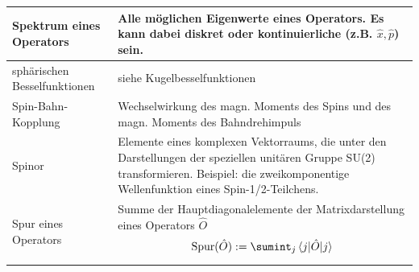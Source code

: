 \documentclass{article}
\begin{document}
\begin{xltabular}{\linewidth}{l|X}
	\hline
		Spektrum eines Operators & Alle möglichen Eigenwerte eines Operators. Es kann dabei diskret oder kontinuierliche (z.B. $\hat{x}, \hat{p}$) sein. \\
	\hline
		sphärischen Besselfunktionen & siehe Kugelbesselfunktionen \\
	\hline
		Spin-Bahn-Kopplung & Wechselwirkung des magn. Moments des Spins und des magn. Moments des Bahndrehimpuls \\
	\hline
		Spinor & Elemente eines komplexen Vektorraums, die unter den Darstellungen der speziellen unitären Gruppe SU(2) transformieren. Beispiel: die zweikomponentige Wellenfunktion eines Spin-1/2-Teilchens. \\
	\hline
		Spur eines Operators & Summe der Hauptdiagonalelemente der Matrixdarstellung eines Operators $\hat{O}$
			$$\text{Spur}(\hat{O}) := \sumint_j \braket{j | \hat{O} | j}$$ 


\end{xltabular}
\end{document}
